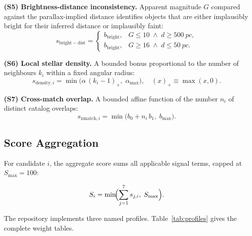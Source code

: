 \documentclass[12pt]{elsarticle}
\begin{document}
\medskip\noindent\textbf{(S5) Brightness-distance inconsistency.} Apparent magnitude $G$ compared against the parallax-implied distance identifies objects that are either implausibly bright for their inferred distance or implausibly faint:
\[
s_{\mathrm{bright}\!-\!\mathrm{dist}} =
\begin{cases}
b_{\mathrm{bright}}, & G \le 10 \;\land\; d \ge \SI{500}{pc}, \\[2pt]
b_{\mathrm{bright}}, & G \ge 16 \;\land\; d \le \SI{50}{pc}.
\end{cases}
\]

\medskip\noindent\textbf{(S6) Local stellar density.} A bounded bonus proportional to the number of neighbours $k_i$ within a fixed angular radius:
\[
s_{\mathrm{density},i} = \min\!\bigl(\alpha\,(k_i - 1)_+,\; \alpha_{\max}\bigr),
\quad (x)_+ \equiv \max(x, 0).
\]

\medskip\noindent\textbf{(S7) Cross-match overlap.} A bounded affine function of the number $n_i$ of distinct catalog overlaps:
\[
s_{\mathrm{xmatch},i} = \min\!\bigl(b_0 + n_i\,b_1,\; b_{\max}\bigr).
\]

\subsection{Score Aggregation}
\label{sec:score_agg}

For candidate $i$, the aggregate score sums all applicable signal terms, capped at $S_{\max}=100$:

\begin{equation}
S_i = \min\!\Bigl(\sum_{j=1}^{7} s_{j,i},\; S_{\max}\Bigr).
\label{eq:score}
\end{equation}

The repository implements three named profiles. Table~\ref{tab:profiles} gives the complete weight tables.
\end{document}
